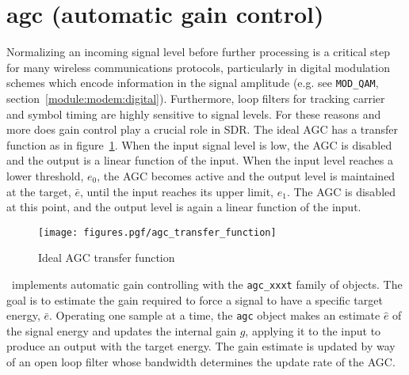 % 
%

\newpage
\section{agc (automatic gain control)}
\label{module:agc}
Normalizing an incoming signal level before further processing is a critical
step for many wireless communications protocols, particularly in digital
modulation schemes which encode information in the signal amplitude (e.g. see
{\tt MOD\_QAM}, section~\ref{module:modem:digital}).
Furthermore, loop filters for tracking carrier and symbol timing are highly
sensitive to signal levels.
For these reasons and more does gain control play a crucial role in SDR.
The ideal AGC has a transfer function as in
figure~\ref{fig:module:agc:transfer_function}.
When the input signal level is low, the AGC is disabled and the output is a
linear function of the input.
When the input level reaches a lower threshold, $e_0$, the AGC becomes active
and the output level is maintained at the target, $\bar{e}$, until the input
reaches its upper limit, $e_1$.
The AGC is disabled at this point, and the output level is again a linear
function of the input.

\begin{figure}
\centering
  \texttt{[image: figures.pgf/agc\_transfer\_function]}
\caption{Ideal AGC transfer function}
\label{fig:module:agc:transfer_function}
\end{figure}

\liquid\ implements automatic gain controlling with the {\tt agc\_xxxt}
family of objects.
The goal is to estimate the gain required to force a signal to have a specific
target energy, $\bar{e}$.
Operating one sample at a time, the {\tt agc} object makes an estimate
$\hat{e}$ of the signal energy and updates the internal gain $g$,
applying it to the input to produce an output with the target energy.
The gain estimate is updated by way of an open loop filter whose bandwidth
determines the update rate of the AGC.

